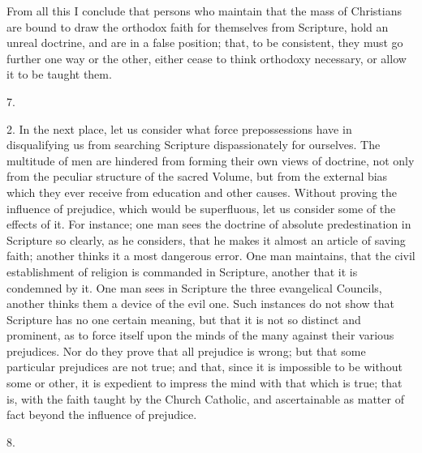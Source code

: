 From all this I conclude that persons who maintain that the mass of
Christians are bound to draw the orthodox faith for themselves from
Scripture, hold an unreal doctrine, and are in a false position; that,
to be consistent, they must go further one way or the other, either
cease to think orthodoxy necessary, or allow it to be taught them.

7.

2. In the next place, let us consider what force prepossessions
have in disqualifying us from searching Scripture dispassionately for
ourselves. The multitude of men are hindered from forming their own
views of doctrine, not only from the peculiar structure of the sacred
Volume, but from the external bias which they ever receive from
education and other causes. Without proving the influence of
prejudice, which would be superfluous, let us consider some of the
effects of it. For instance; one man sees the doctrine of absolute
predestination in Scripture so clearly, as he considers, that he makes
it almost an article of saving faith; another thinks it a most
dangerous error. One man maintains, that the civil establishment of
religion is commanded in Scripture, another that it is condemned by
it. One man sees in Scripture the three evangelical Councils, another
thinks them a device of the evil one. Such instances do not show that
Scripture has no one certain meaning, but that it is not so distinct
and prominent, as to force itself upon the minds of the many against
their various prejudices. Nor do they prove that all prejudice is
wrong; but that some particular prejudices are not true; and that,
since it is impossible to be without some or other, it is expedient to
impress the mind with that which is true; that is, with the faith
taught by the Church Catholic, and ascertainable as matter of fact
beyond the influence of prejudice.

8.


